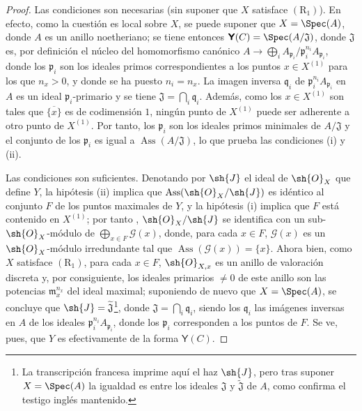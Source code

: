 \begin{proof}
Las condiciones son necesarias (sin suponer que $X$ satisface $(\mathrm{R}_1)$).
En efecto, como la cuestión es local sobre $X$, se puede suponer que $X=\Spec(A)$, donde $A$ es un anillo noetheriano;
se tiene entonces $\boldsymbol{\mathsf{Y}}(C)=\Spec(A/\mathfrak{J})$, donde $\mathfrak{J}$ es, por definición  el núcleo del homomorfismo canónico $A\to\bigoplus_i A_{\mathfrak{p}_i}/\mathfrak{p}_i^{n_i}A_{\mathfrak{p}_i}$, donde los $\mathfrak{p}_i$ son los ideales primos correspondientes a los puntos $x\in X^{(1)}$ para los que $n_x>0$, y donde se ha puesto $n_i=n_x$.
La imagen inversa $\mathfrak{q}_i$ de $\mathfrak{p}_i^{n_i}A_{\mathfrak{p}_i}$ en $A$ es un ideal $\mathfrak{p}_i$-primario y se tiene $\mathfrak{J}=\bigcap_i\mathfrak{q}_i$.
Además, como los $x\in X^{(1)}$ son tales que $\overline{\{x\}}$ es de codimensión $1$, ningún punto de $X^{(1)}$ puede ser adherente a otro punto de $X^{(1)}$.
Por tanto, los $\mathfrak{p}_i$ son los ideales primos minimales de $A/\mathfrak{J}$ y el conjunto de los $\mathfrak{p}_i$ es igual a $\operatorname{Ass}(A/\mathfrak{J})$, lo que prueba las condiciones (i) y (ii).

Las condiciones son suficientes.
Denotando por $\sh{J}$ el ideal de $\sh{O}_X$ que define $Y$, la hipótesis (ii) implica que $\operatorname{Ass}(\sh{O}_X/\sh{J})$ es idéntico al conjunto $F$ de los puntos maximales de $Y$, y la hipótesis (i) implica que $F$ está contenido en $X^{(1)}$;
por tanto , $\sh{O}_X/\sh{J}$ se identifica con un sub-$\sh{O}_X$-módulo de $\bigoplus_{x\in F}\mathscr{G}(x)$, donde, para cada $x\in F$, $\mathscr{G}(x)$ es un $\sh{O}_X$-módulo irredundante tal que $\operatorname{Ass}(\mathscr{G}(x))=\{x\}$.
Ahora bien, como $X$ satisface $(\mathrm{R}_1)$, para cada $x\in F$, $\sh{O}_{X,x}$ es un anillo de valoración discreta y, por consiguiente, los ideales primarios $\neq0$ de este anillo son las potencias $\mathfrak{m}_x^{n_x}$ del ideal maximal;
suponiendo de nuevo que $X=\Spec(A)$, se concluye que $\sh{J}=\widetilde{\mathfrak{J}}$\footnote{La transcripción francesa imprime aquí el haz $\sh{J}$, pero tras suponer $X=\Spec(A)$ la igualdad es entre los ideales $\mathfrak{J}$ y $\widetilde{\mathfrak{J}}$ de $A$, como confirma el testigo inglés mantenido.}, donde $\mathfrak{J}=\bigcap_i\mathfrak{q}_i$, siendo los $\mathfrak{q}_i$ las imágenes inversas en $A$ de los ideales $\mathfrak{p}_i^{n_i}A_{\mathfrak{p}_i}$, donde los $\mathfrak{p}_i$ corresponden a los puntos de $F$.
Se ve, pues, que $Y$ es efectivamente de la forma $\boldsymbol{\mathsf{Y}}(C)$.
\end{proof}

